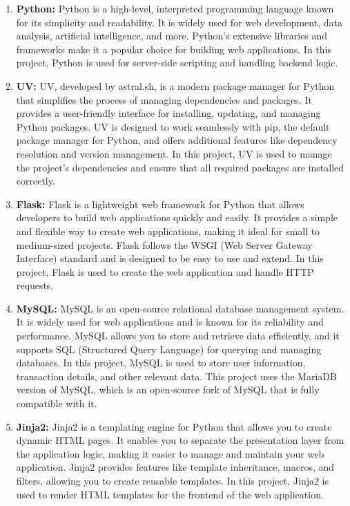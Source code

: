 \begin{enumerate}
    \item \textbf{Python:}
    Python is a high-level, interpreted programming language known for its
    simplicity and readability. It is widely used for web development, data
    analysis, artificial intelligence, and more. Python's extensive libraries
    and frameworks make it a popular choice for building web applications. In
    this project, Python is used for server-side scripting and handling
    backend logic.

    \item \textbf{UV:}
    UV, developed by astral.sh, is a modern package manager for Python that
    simplifies the process of managing dependencies and packages. It provides a
    user-friendly interface for installing, updating, and managing Python
    packages. UV is designed to work seamlessly with pip, the default package
    manager for Python, and offers additional features like dependency
    resolution and version management. In this project, UV is used to manage
    the project's dependencies and ensure that all required packages are
    installed correctly.

    \item \textbf{Flask:}
    Flask is a lightweight web framework for Python that allows developers to
    build web applications quickly and easily. It provides a simple and
    flexible way to create web applications, making it ideal for small to
    medium-sized projects. Flask follows the WSGI (Web Server Gateway
    Interface) standard and is designed to be easy to use and extend. In this
    project, Flask is used to create the web application and handle HTTP
    requests.

    \item \textbf{MySQL:}
    MySQL is an open-source relational database management system. It is widely
    used for web applications and is known for its reliability and performance.
    MySQL allows you to store and retrieve data efficiently, and it supports
    SQL (Structured Query Language) for querying and managing databases. In
    this project, MySQL is used to store user information, transaction details,
    and other relevant data. This project uses the MariaDB version of MySQL,
    which is an open-source fork of MySQL that is fully compatible with it.

    \item \textbf{Jinja2:}
    Jinja2 is a templating engine for Python that allows you to create dynamic
    HTML pages. It enables you to separate the presentation layer from the
    application logic, making it easier to manage and maintain your web
    application. Jinja2 provides features like template inheritance, macros,
    and filters, allowing you to create reusable templates. In this project,
    Jinja2 is used to render HTML templates for the frontend of the web
    application.


\end{enumerate}
